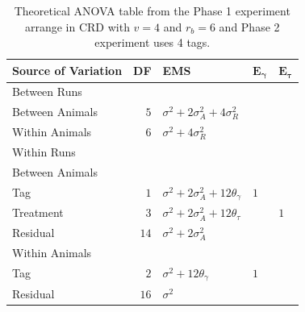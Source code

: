 \documentclass[12pt,a4paper]{article}
\begin{document}
\begin{table}[ht]
\centering
 \caption{Theoretical ANOVA table from the Phase 1 experiment arrange in CRD with $v = 4$ and $r_b = 6$ and Phase 2 experiment uses 4 tags.}
 \begin{tabular}[t]{lrlll} 
 \toprule 
 \multicolumn{1}{l}{\textbf{Source of Variation}} & \multicolumn{1}{l}{\textbf{DF}} & \multicolumn{1}{l}{\textbf{EMS}}& \multicolumn{1}{l}{$\bm{E_{\gamma}}$}&\multicolumn{1}{l}{$\bm{E_{\tau}}$}\\ 
 \midrule 
 Between Runs &  &  & & \\ 
 \quad Between Animals & $5$ & $\sigma^2+2\sigma_{A}^2+4\sigma_{R}^2$ & & \\  \quad Within Animals & $6$ & $\sigma^2+4\sigma_{R}^2$ & & \\ \hline 
 Within Runs &  &  & & \\ 
 \quad Between Animals &  &  & & \\ 
 \quad \quad Tag & $1$ & $\sigma^2+2\sigma_{A}^2+12\theta_{\gamma}$ &$1$ & \\ 
 \quad \quad Treatment & $3$ & $\sigma^2+2\sigma_{A}^2+12\theta_{\tau}$ & & $1$\\ 
 \quad \quad Residual & $14$ & $\sigma^2+2\sigma_{A}^2$ & & \\ \hline 
 \quad Within Animals &  &  & & \\ 
 \quad \quad Tag & $2$ & $\sigma^2+12\theta_{\gamma}$ &$1$ & \\ 
 \quad \quad Residual & $16$ & $\sigma^2$ & & \\ 
 \bottomrule 
 \end{tabular} 
 \label{tab:ANOVAPhase1CRD21} 
\end{table} 
\end{document}
